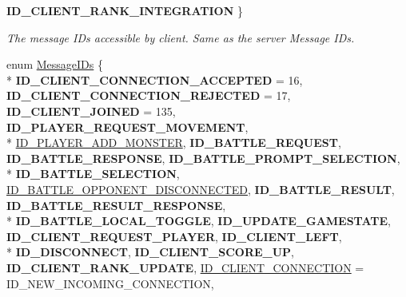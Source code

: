\begin{DoxyCompactItemize}
{\bfseries I\-D\-\_\-\-C\-L\-I\-E\-N\-T\-\_\-\-R\-A\-N\-K\-\_\-\-I\-N\-T\-E\-G\-R\-A\-T\-I\-O\-N}
 \}
\begin{DoxyCompactList}\small\item\em The message I\-Ds accessible by client. Same as the server Message I\-Ds. \end{DoxyCompactList}\item 
enum \hyperlink{namespace_champ_net_plugin_a2ade5cfa7cf6c25ab7236c6b54a57821}{Message\-I\-Ds} \{ \\*
{\bfseries I\-D\-\_\-\-C\-L\-I\-E\-N\-T\-\_\-\-C\-O\-N\-N\-E\-C\-T\-I\-O\-N\-\_\-\-A\-C\-C\-E\-P\-T\-E\-D} = 16, 
{\bfseries I\-D\-\_\-\-C\-L\-I\-E\-N\-T\-\_\-\-C\-O\-N\-N\-E\-C\-T\-I\-O\-N\-\_\-\-R\-E\-J\-E\-C\-T\-E\-D} = 17, 
{\bfseries I\-D\-\_\-\-C\-L\-I\-E\-N\-T\-\_\-\-J\-O\-I\-N\-E\-D} = 135, 
{\bfseries I\-D\-\_\-\-P\-L\-A\-Y\-E\-R\-\_\-\-R\-E\-Q\-U\-E\-S\-T\-\_\-\-M\-O\-V\-E\-M\-E\-N\-T}, 
\\*
\hyperlink{namespace_champ_net_plugin_a2ade5cfa7cf6c25ab7236c6b54a57821ad42c079bb7459dbaf419eeb2e845f3e2}{I\-D\-\_\-\-P\-L\-A\-Y\-E\-R\-\_\-\-A\-D\-D\-\_\-\-M\-O\-N\-S\-T\-E\-R}, 
{\bfseries I\-D\-\_\-\-B\-A\-T\-T\-L\-E\-\_\-\-R\-E\-Q\-U\-E\-S\-T}, 
{\bfseries I\-D\-\_\-\-B\-A\-T\-T\-L\-E\-\_\-\-R\-E\-S\-P\-O\-N\-S\-E}, 
{\bfseries I\-D\-\_\-\-B\-A\-T\-T\-L\-E\-\_\-\-P\-R\-O\-M\-P\-T\-\_\-\-S\-E\-L\-E\-C\-T\-I\-O\-N}, 
\\*
{\bfseries I\-D\-\_\-\-B\-A\-T\-T\-L\-E\-\_\-\-S\-E\-L\-E\-C\-T\-I\-O\-N}, 
\hyperlink{namespace_champ_net_plugin_a2ade5cfa7cf6c25ab7236c6b54a57821addd7d4ef5710787934d893be10785f0d}{I\-D\-\_\-\-B\-A\-T\-T\-L\-E\-\_\-\-O\-P\-P\-O\-N\-E\-N\-T\-\_\-\-D\-I\-S\-C\-O\-N\-N\-E\-C\-T\-E\-D}, 
{\bfseries I\-D\-\_\-\-B\-A\-T\-T\-L\-E\-\_\-\-R\-E\-S\-U\-L\-T}, 
{\bfseries I\-D\-\_\-\-B\-A\-T\-T\-L\-E\-\_\-\-R\-E\-S\-U\-L\-T\-\_\-\-R\-E\-S\-P\-O\-N\-S\-E}, 
\\*
{\bfseries I\-D\-\_\-\-B\-A\-T\-T\-L\-E\-\_\-\-L\-O\-C\-A\-L\-\_\-\-T\-O\-G\-G\-L\-E}, 
{\bfseries I\-D\-\_\-\-U\-P\-D\-A\-T\-E\-\_\-\-G\-A\-M\-E\-S\-T\-A\-T\-E}, 
{\bfseries I\-D\-\_\-\-C\-L\-I\-E\-N\-T\-\_\-\-R\-E\-Q\-U\-E\-S\-T\-\_\-\-P\-L\-A\-Y\-E\-R}, 
{\bfseries I\-D\-\_\-\-C\-L\-I\-E\-N\-T\-\_\-\-L\-E\-F\-T}, 
\\*
{\bfseries I\-D\-\_\-\-D\-I\-S\-C\-O\-N\-N\-E\-C\-T}, 
{\bfseries I\-D\-\_\-\-C\-L\-I\-E\-N\-T\-\_\-\-S\-C\-O\-R\-E\-\_\-\-U\-P}, 
{\bfseries I\-D\-\_\-\-C\-L\-I\-E\-N\-T\-\_\-\-R\-A\-N\-K\-\_\-\-U\-P\-D\-A\-T\-E}, 
\hyperlink{namespace_champ_net_plugin_a2ade5cfa7cf6c25ab7236c6b54a57821aecc0564c52e3106cfe012e5533b080da}{I\-D\-\_\-\-C\-L\-I\-E\-N\-T\-\_\-\-C\-O\-N\-N\-E\-C\-T\-I\-O\-N} = I\-D\-\_\-\-N\-E\-W\-\_\-\-I\-N\-C\-O\-M\-I\-N\-G\-\_\-\-C\-O\-N\-N\-E\-C\-T\-I\-O\-N, 

\end{DoxyCompactItemize}
